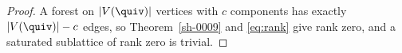 \begin{proof}
A forest on $|V(\quiv)|$ vertices with $c$ components has exactly $|V(\quiv)| - c$ edges, so Theorem~\ref{sh-0009} and \eqref{eq:rank} give rank zero, and a saturated sublattice of rank zero is trivial.
\end{proof}